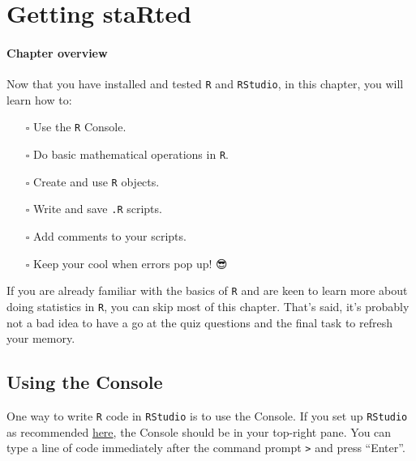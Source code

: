 \documentclass[
  letterpaper,
  DIV=11,
  numbers=noendperiod,
  oneside]{scrreprt}
\providecommand{\tightlist}{%
  \setlength{\itemsep}{0pt}\setlength{\parskip}{0pt}}\usepackage{longtable,booktabs,array}
\begin{document}

\chapter{Getting staRted}\label{getting-started}

\subsubsection*{\texorpdfstring{\textbf{Chapter
overview}}{Chapter overview}}\label{chapter-overview-1}

Now that you have installed and tested \texttt{R} and \texttt{RStudio},
in this chapter, you will learn how to:

\begin{itemize}
\tightlist
\item[$\square$]
  Use the \texttt{R} Console.
\item[$\square$]
  Do basic mathematical operations in \texttt{R}.
\item[$\square$]
  Create and use \texttt{R} objects.
\item[$\square$]
  Write and save \texttt{.R} scripts.
\item[$\square$]
  Add comments to your scripts.
\item[$\square$]
  Keep your cool when errors pop up! 😎
\end{itemize}

If you are already familiar with the basics of \texttt{R} and are keen
to learn more about doing statistics in \texttt{R}, you can skip most of
this chapter. That's said, it's probably not a bad idea to have a go at
the quiz questions and the final task to refresh your memory.

\section{Using the Console}\label{using-the-console}

{}

One way to write \texttt{R} code in \texttt{RStudio} is to use the
Console. If you set up \texttt{RStudio} as recommended
\href{https://elenlefoll.github.io/RstatsTextbook/InstallingR.html\#global-options}{here},
the Console should be in your top-right pane. You can type a line of
code immediately after the command prompt \texttt{\textgreater{}} and
press ``Enter''.
\end{document}
